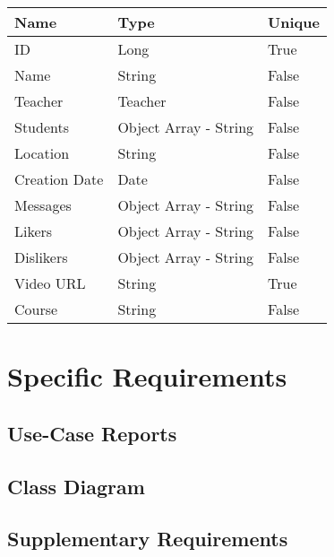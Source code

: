 \documentclass[12pt,a4paper]{article}
\begin{document}
    \begin{table}[h]
        \centering
        \begin{tabular}{|l|l|l|}
            \hline
            \textbf{Name} & \textbf{Type} & \textbf{Unique} \\
            \hline
            ID & Long & True \\
            \hline
            Name & String & False \\
            \hline
            Teacher & Teacher & False \\
            \hline
            Students & Object Array - String & False \\
            \hline
            Location & String & False \\
            \hline
            Creation Date & Date & False \\
            \hline
            Messages & Object Array - String & False \\
            \hline
            Likers & Object Array - String & False \\
            \hline
            Dislikers & Object Array - String & False \\
            \hline
            Video URL & String & True \\
            \hline
            Course & String & False \\
            \hline
        \end{tabular}
    \end{table}


    \newpage




    \section{Specific Requirements}


    \subsection{Use-Case Reports}

    \subsection{Class Diagram}

    \subsection{Supplementary Requirements}
\end{document}
